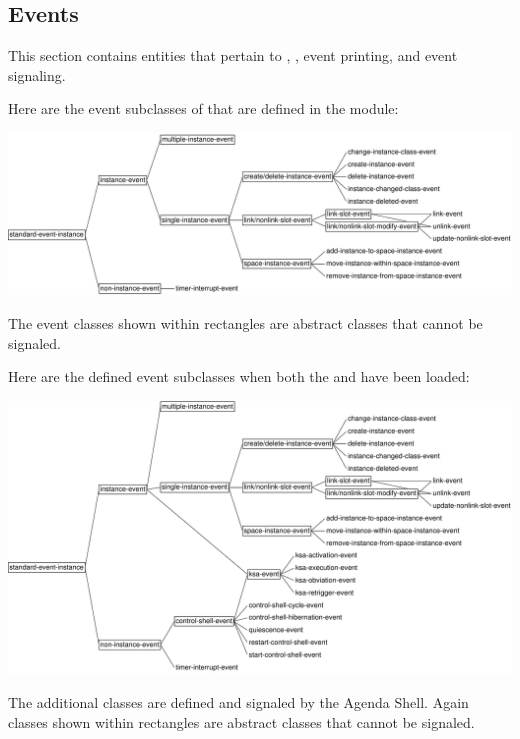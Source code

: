 \documentclass[10pt,twoside,english,pdftex]{article}
\begin{document}
\subsection{Events}
\label{sec:events}%

This section contains  entities that pertain to
, , event printing, and event signaling.

%
Here are the event subclasses of  that
are defined in the  module:

\T\begin{ifhtml}
\T\end{ifhtml}
\W\begin{iftex} 
\begin{center}
\includegraphics[scale=0.85]{gbbopen-events}
\end{center}
\W\end{iftex}

\noindent The event classes shown within rectangles are abstract classes
that cannot be signaled.

\W{}

Here are the defined event subclasses when both the
 and  
have been loaded:
%
\T\begin{ifhtml}
\T\end{ifhtml}
\W\begin{iftex} 
\begin{center}
\includegraphics[scale=0.85]{agenda-shell-events}
\end{center}
\W\end{iftex}
%
The additional  classes are defined and
signaled by the Agenda Shell.  Again classes shown within rectangles are
abstract classes that cannot be signaled.
\end{document}
